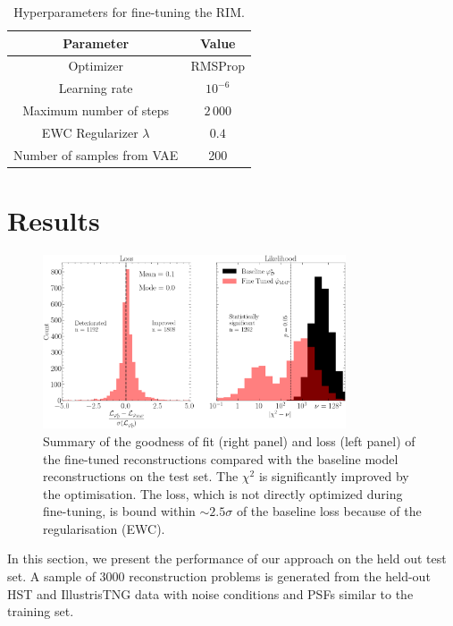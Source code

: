 \documentclass[twocolumn]{aastex631}
\begin{document}
\begin{table}[H]
        \centering
        \caption{Hyperparameters for fine-tuning the RIM.}
        \label{tab:fine-tuning hparams}
        \begin{tabular}{cc}
                Parameter & Value \\\hline\hline
                Optimizer & RMSProp \\
                Learning rate & $10^{-6}$\\
                Maximum number of steps & $2\,000$\\
                EWC Regularizer $\lambda$ & $0.4$\\
                Number of samples from VAE & 200 \\
                \hline
        \end{tabular}
\end{table}

\section{Results}\label{sec:results}

\begin{figure}[ht!]
        \centering
        \includegraphics[width=0.8\textwidth]{figures/prior_and_likelihood}
        \caption{Summary of the goodness of fit (right panel) and loss (left panel) 
        of the fine-tuned reconstructions compared with the baseline model reconstructions 
        on the test set. The 
        $\chi^2$ is significantly improved by the optimisation. The loss, which is not directly 
        optimized during fine-tuning, is bound within $\sim 2.5\sigma$ 
        of the baseline loss because of the regularisation (EWC).
}
        \label{fig:loss and chi squared}
\end{figure}



In this section, we present the performance of our approach 
on the held out test set. A sample of 3000 reconstruction 
problems is generated from the held-out HST and IllustrisTNG data 
with noise conditions and PSFs similar to the training set.
\end{document}
